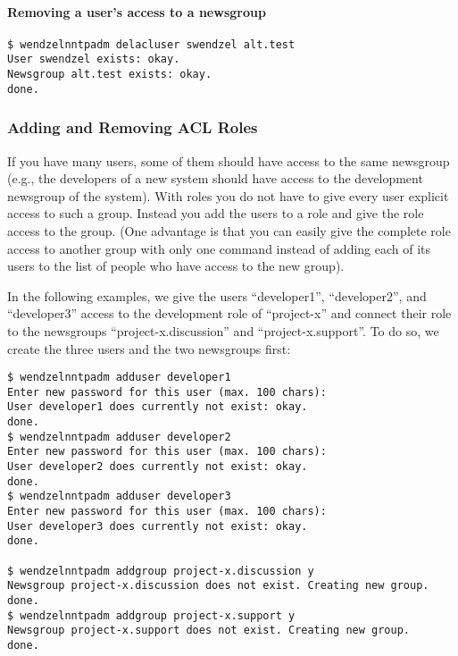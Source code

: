 \documentclass[12pt,fleqn,leqno]{scrbook}
\begin{document}
\hypertarget{removing-a-users-access-to-a-newsgroup}{%
\paragraph{Removing a user's access to a
newsgroup}\label{removing-a-users-access-to-a-newsgroup}}

\begin{verbatim}
$ wendzelnntpadm delacluser swendzel alt.test
User swendzel exists: okay.
Newsgroup alt.test exists: okay.
done.
\end{verbatim}

\hypertarget{adding-and-removing-acl-roles}{%
\subsubsection{Adding and Removing ACL
Roles}\label{adding-and-removing-acl-roles}}

If you have many users, some of them should have access to the same
newsgroup (e.g., the developers of a new system should have access to
the development newsgroup of the system). With roles you do not have to
give every user explicit access to such a group. Instead you add the
users to a role and give the role access to the group. (One advantage is
that you can easily give the complete role access to another group with
only one command instead of adding each of its users to the list of
people who have access to the new group).

In the following examples, we give the users ``developer1'',
``developer2'', and ``developer3'' access to the development role of
``project-x'' and connect their role to the newsgroups
``project-x.discussion'' and ``project-x.support''. To do so, we create
the three users and the two newsgroups first:

\begin{verbatim}
$ wendzelnntpadm adduser developer1
Enter new password for this user (max. 100 chars):
User developer1 does currently not exist: okay.
done.
$ wendzelnntpadm adduser developer2
Enter new password for this user (max. 100 chars):
User developer2 does currently not exist: okay.
done.
$ wendzelnntpadm adduser developer3
Enter new password for this user (max. 100 chars):
User developer3 does currently not exist: okay.
done.

$ wendzelnntpadm addgroup project-x.discussion y
Newsgroup project-x.discussion does not exist. Creating new group.
done.
$ wendzelnntpadm addgroup project-x.support y
Newsgroup project-x.support does not exist. Creating new group.
done.
\end{verbatim}
\end{document}
